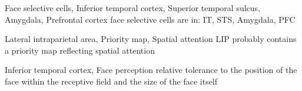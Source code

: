 \begin{kite}{Face selective cells, Inferior temporal cortex, Superior temporal sulcus, Amygdala, Prefrontal cortex}
face selective cells are in: IT, STS, Amygdala, PFC
\par{}
\end{kite}


\begin{kite}{Lateral intraparietal area, Priority map, Spatial attention}
LIP probably contains a priority map reflecting spatial attention
\par{}
\end{kite}


\begin{kite}{Inferior temporal cortex, Face perception}
relative tolerance to the position of the face within the receptive
field and the size of the face itself
\par{}
\end{kite}
